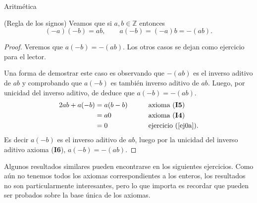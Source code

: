 \begin{section}{Aritmética}
%
%
%
%
%


\begin{ejemplo} (Regla de los signos) Veamos que  si $a,b \in \mathbb Z$ entonces
$$
(-a)(-b) = ab ,\qquad a(-b) = (-a)b = -(ab).
$$
\end{ejemplo}
\begin{proof}
Veremos que  $a(-b) = -(ab)$. Los otros casos se dejan como ejercicio para el lector.

Una forma de demostrar este caso es  observando que $-(ab)$ es el inverso aditivo de $ab$ y comprobando que $a(-b)$ es también inverso aditivo de $ab$. Luego, por unicidad del inverso aditivo, de deduce que $a(-b) = -(ab)$. 
\begin{alignat*}2
ab + a(-b) &=a(b-b) &\qquad &\text{axioma ({\bf I5})} \\
&=a0 &\qquad &\text{axioma ({\bf I4})}\\
&= 0 &\qquad &\text{ejercicio (\ref{ej0a})}.
\end{alignat*}
Es decir $a(-b)$ es el inverso aditivo de $ab$, luego por la unicidad del inverso aditivo axioma ({\bf I6}), $a(-b)=-(ab)$.
\end{proof}


Algunos resultados similares pueden encontrarse en los siguientes ejercicios. Como aún no tenemos todos los axiomas correspondientes a los enteros, los resultados no son particularmente interesantes, pero lo que importa es recordar que pueden ser probados sobre la base única de los axiomas.



\end{section}

